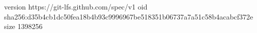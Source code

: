 version https://git-lfs.github.com/spec/v1
oid sha256:d35b4cb1dc50fea18b4b93c9996967be518351b06737a7a51c58b4acabcf372e
size 1398256
